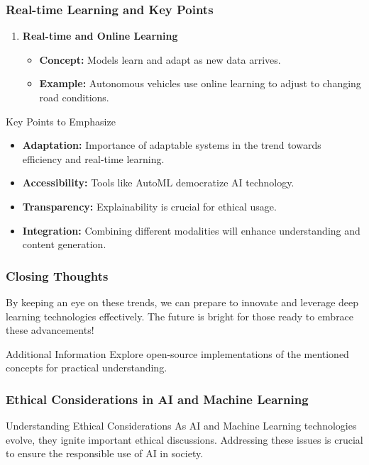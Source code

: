 \documentclass[aspectratio=169]{beamer}
\begin{document}
\begin{frame}[fragile]
    \frametitle{Real-time Learning and Key Points}
    \begin{enumerate}
        \item \textbf{Real-time and Online Learning}
            \begin{itemize}
                \item \textbf{Concept:} Models learn and adapt as new data arrives.
                \item \textbf{Example:} Autonomous vehicles use online learning to adjust to changing road conditions.
            \end{itemize}
    \end{enumerate}

    \begin{block}{Key Points to Emphasize}
        \begin{itemize}
            \item \textbf{Adaptation:} Importance of adaptable systems in the trend towards efficiency and real-time learning.
            \item \textbf{Accessibility:} Tools like AutoML democratize AI technology.
            \item \textbf{Transparency:} Explainability is crucial for ethical usage.
            \item \textbf{Integration:} Combining different modalities will enhance understanding and content generation.
        \end{itemize}
    \end{block}
\end{frame}

\begin{frame}[fragile]
    \frametitle{Closing Thoughts}
    By keeping an eye on these trends, we can prepare to innovate and leverage deep learning technologies effectively. The future is bright for those ready to embrace these advancements! 

    \begin{block}{Additional Information}
        Explore open-source implementations of the mentioned concepts for practical understanding.
    \end{block}
\end{frame}

\begin{frame}[fragile]
    \frametitle{Ethical Considerations in AI and Machine Learning}
    \begin{block}{Understanding Ethical Considerations}
        As AI and Machine Learning technologies evolve, they ignite important ethical discussions. Addressing these issues is crucial to ensure the responsible use of AI in society.
    \end{block}
\end{frame}
\end{document}
